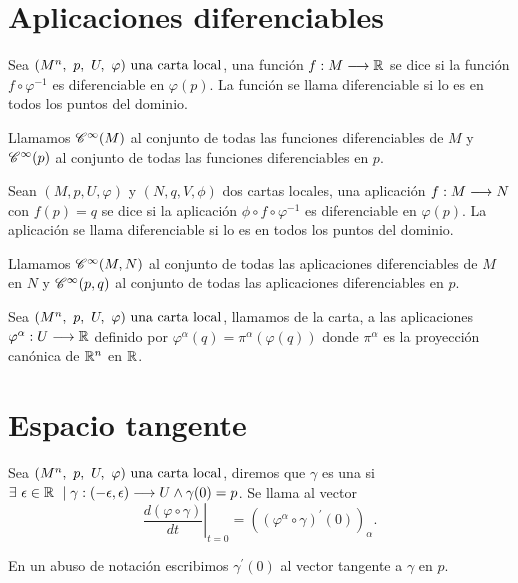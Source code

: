 \section{Aplicaciones diferenciables}\label{sec:aplicaciones-diferenciables}

\begin{definition}
  Sea $(M^n,\ p,\ U,\ \varphi)\textmd{ una carta local}$, una función $f:M\longrightarrow \mathbb{R}$ se dice
   si la función $f\circ\varphi^{-1}$ es
  diferenciable en $\varphi(p)$.
  La función se llama diferenciable si lo es en todos los puntos del dominio.
\end{definition}

\begin{notation}
  Llamamos $\mathscr{C}^\infty(M)$ al conjunto de todas las funciones diferenciables de $M$ y
  $\mathscr{C}^\infty(p)$ al conjunto de todas las funciones diferenciables en $p$.
\end{notation}

\begin{definition}
  Sean $(M, p, U, \varphi)$ y $(N, q, V, \phi)$ dos cartas locales, una aplicación
  $f:M\longrightarrow N$ con $f(p)=q$ se dice
   si la aplicación
  $\phi\circ f\circ\varphi^{-1}$ es diferenciable en $\varphi(p)$.
  La aplicación se llama diferenciable si lo es en todos los puntos del dominio.
\end{definition}

\begin{notation}
  Llamamos $\mathscr{C}^\infty(M, N)$ al conjunto de todas las aplicaciones diferenciables de $M$ en $N$ y
  $\mathscr{C}^\infty(p, q)$ al conjunto de todas las aplicaciones diferenciables en $p$.
\end{notation}

\begin{definition}
  Sea $(M^n,\ p,\ U,\ \varphi)\textmd{ una carta local}$, llamamos  de la carta, a las
  aplicaciones $\varphi^\alpha:U\longrightarrow \mathbb{R}$ definido por $\varphi^\alpha(q)=\pi^\alpha(\varphi
  (q))$
  donde $\pi^\alpha$ es la proyección canónica de $\mathbb{R}^n$ en $\mathbb{R}$.
\end{definition}


\section{Espacio tangente}\label{sec:espacio-tangente}
\begin{definition}
  Sea $(M^n,\ p,\ U,\ \varphi)\textmd{ una carta local}$, diremos que $\gamma$ es una  si $\exists\ \epsilon\in\mathbb{R} \ \mid \gamma:(-\epsilon,\epsilon)\longrightarrow U\land
  \gamma(0)=p$.
  Se llama  al vector
  \begin{equation}
    \label{eq:derivada-curva}
    \left.\frac{d(\varphi\circ\gamma)
    }{dt}\right|_{t=0}=((\varphi^\alpha\circ\gamma)^{'}(0))_\alpha.
  \end{equation}
\end{definition}
\begin{notation}
  En un abuso de notación escribimos $\gamma^{'}(0)$ al vector tangente a $\gamma$ en $p$.
\end{notation}

